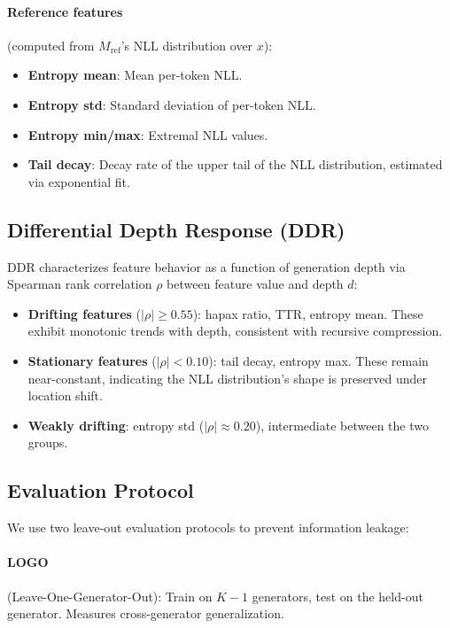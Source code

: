 \documentclass[11pt,twocolumn]{article}
\begin{document}
\paragraph{Reference features} (computed from $M_{\text{ref}}$'s NLL distribution over $x$):
\begin{itemize}[nosep,leftmargin=*]
    \item \textbf{Entropy mean}: Mean per-token NLL.
    \item \textbf{Entropy std}: Standard deviation of per-token NLL.
    \item \textbf{Entropy min/max}: Extremal NLL values.
    \item \textbf{Tail decay}: Decay rate of the upper tail of the NLL distribution, estimated via exponential fit.
\end{itemize}

\subsection{Differential Depth Response (DDR)}

DDR characterizes feature behavior as a function of generation depth via Spearman rank correlation $\rho$ between feature value and depth $d$:
\begin{itemize}[nosep,leftmargin=*]
    \item \textbf{Drifting features} ($|\rho| \geq 0.55$): hapax ratio, TTR, entropy mean. These exhibit monotonic trends with depth, consistent with recursive compression.
    \item \textbf{Stationary features} ($|\rho| < 0.10$): tail decay, entropy max. These remain near-constant, indicating the NLL distribution's shape is preserved under location shift.
    \item \textbf{Weakly drifting}: entropy std ($|\rho| \approx 0.20$), intermediate between the two groups.
\end{itemize}

\subsection{Evaluation Protocol}

We use two leave-out evaluation protocols to prevent information leakage:

\paragraph{LOGO} (Leave-One-Generator-Out): Train on $K{-}1$ generators, test on the held-out generator. Measures cross-generator generalization.
\end{document}
